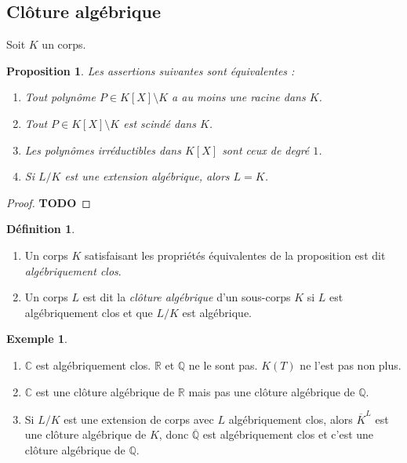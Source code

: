 \documentclass{article}
\newcommand{\Q}{\mathbb{Q}}
\newcommand{\Qbar}{\overline{\mathbb{Q}}}
\newcommand{\R}{\mathbb{R}}
\newcommand{\C}{\mathbb{C}}
\newcommand{\todo}{\textbf{TODO}}
\theoremstyle{plain}
\newtheorem{proposition}[theorem]{Proposition}
\theoremstyle{definition}
\newtheorem{definition}[theorem]{Définition}
\newtheorem{example}[theorem]{Exemple}
\theoremstyle{remark}
\begin{document}
\subsection{Clôture algébrique}

Soit $K$ un corps.

\begin{proposition}
    Les assertions suivantes sont équivalentes :
    \begin{enumerate}
        \item Tout polynôme $P \in K[X] \setminus K$ a au moins une racine dans $K$.
        \item Tout $P \in K[X] \setminus K$ est scindé dans $K$.
        \item Les polynômes irréductibles dans $K[X]$ sont ceux de degré $1$.
        \item Si $L/K$ est une extension algébrique, alors $L=K$.
    \end{enumerate}
\end{proposition}

\begin{proof}
    \todo
\end{proof}

\begin{definition} \leavevmode
    \begin{enumerate}
        \item Un corps $K$ satisfaisant les propriétés équivalentes de la proposition est dit \emph{algébriquement clos}.
        \item Un corps $L$ est dit la \emph{clôture algébrique} d'un sous-corps $K$ si $L$ est algébriquement clos et que $L/K$ est algébrique.
    \end{enumerate}
\end{definition}

\begin{example} \leavevmode
    \begin{enumerate}
        \item $\C$ est algébriquement clos. $\R$ et $\Q$ ne le sont pas. $K(T)$ ne l'est pas non plus.
        \item $\C$ est une clôture algébrique de $\R$ mais pas une clôture algébrique de $\Q$.
        \item Si $L/K$ est une extension de corps avec $L$ algébriquement clos, alors $\overline{K}^L$ est une clôture algébrique de $K$, donc $\Qbar$ est algébriquement clos et c'est une clôture algébrique de $\Q$.
    \end{enumerate}
\end{example}
\end{document}
